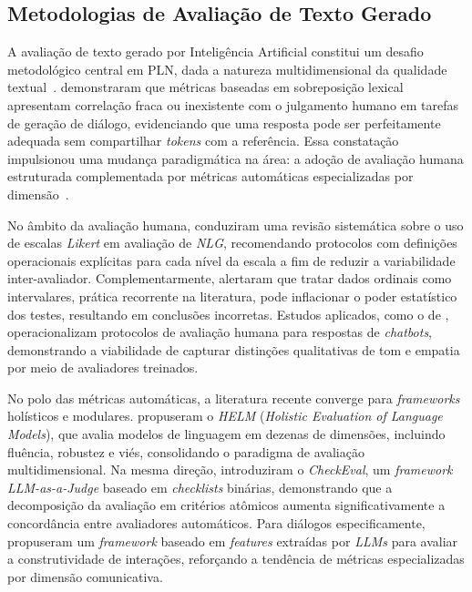 \documentclass[12pt, a4paper]{article}
\numberwithin{equation}{section}
\begin{document}
\subsection{Metodologias de Avaliação de Texto Gerado}

A avaliação de texto gerado por Inteligência Artificial constitui um desafio metodológico central em PLN, dada a natureza multidimensional da qualidade textual~\cite{celikyilmaz2021Evaluation}.  demonstraram que métricas baseadas em sobreposição lexical apresentam correlação fraca ou inexistente com o julgamento humano em tarefas de geração de diálogo, evidenciando que uma resposta pode ser perfeitamente adequada sem compartilhar \textit{tokens} com a referência. Essa constatação impulsionou uma mudança paradigmática na área: a adoção de avaliação humana estruturada complementada por métricas automáticas especializadas por dimensão~\cite{howcroft2020twenty}.

No âmbito da avaliação humana,  conduziram uma revisão sistemática sobre o uso de escalas \textit{Likert} em avaliação de \textit{NLG}, recomendando protocolos com definições operacionais explícitas para cada nível da escala a fim de reduzir a variabilidade inter-avaliador. Complementarmente,  alertaram que tratar dados ordinais como intervalares, prática recorrente na literatura, pode inflacionar o poder estatístico dos testes, resultando em conclusões incorretas. Estudos aplicados, como o de \cite{sedoc2019chateval}, operacionalizam protocolos de avaliação humana para respostas de \textit{chatbots}, demonstrando a viabilidade de capturar distinções qualitativas de tom e empatia por meio de avaliadores treinados.

No polo das métricas automáticas, a literatura recente converge para \textit{frameworks} holísticos e modulares.  propuseram o \textit{HELM} (\textit{Holistic Evaluation of Language Models}), que avalia modelos de linguagem em dezenas de dimensões, incluindo fluência, robustez e viés, consolidando o paradigma de avaliação multidimensional. Na mesma direção,  introduziram o \textit{CheckEval}, um \textit{framework} \textit{LLM-as-a-Judge} baseado em \textit{checklists} binárias, demonstrando que a decomposição da avaliação em critérios atômicos aumenta significativamente a concordância entre avaliadores automáticos. Para diálogos especificamente,  propuseram um \textit{framework} baseado em \textit{features} extraídas por \textit{LLMs} para avaliar a construtividade de interações, reforçando a tendência de métricas especializadas por dimensão comunicativa.
\end{document}
